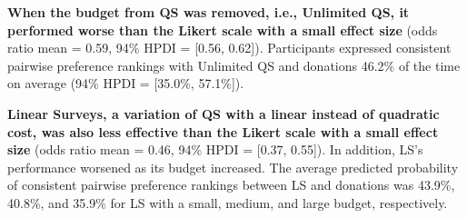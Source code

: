 \textbf{When the budget from QS was removed, i.e., Unlimited QS, it performed worse than the Likert scale with a small effect size} (odds ratio mean = 0.59, 94\% HPDI = [0.56, 0.62]). Participants expressed consistent pairwise preference rankings with Unlimited QS and donations 46.2\% of the time on average (94\% HPDI = [35.0\%, 57.1\%]). 

\textbf{Linear Surveys, a variation of QS with a linear instead of quadratic cost, was also less effective than the Likert scale with a small effect size} (odds ratio mean = 0.46, 94\% HPDI = [0.37, 0.55]). In addition, LS's performance worsened as its budget increased. The average predicted probability of consistent pairwise preference rankings between LS and donations was 43.9\%, 40.8\%, and 35.9\% for LS with a small, medium, and large budget, respectively.  